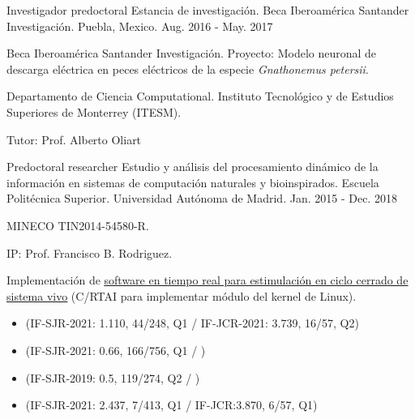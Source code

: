 \begin{cventries}
  \cventry
    {Investigador predoctoral} %
    {Estancia de investigación. Beca Iberoamérica Santander Investigación.} %
    {Puebla, Mexico.} %
    {Aug. 2016 - May. 2017} %
    {
    \begin{cvitems}
     \item {Beca Iberoamérica Santander Investigación. Proyecto: Modelo neuronal de descarga eléctrica en peces eléctricos de la especie \textit{Gnathonemus petersii}.}
     \item {Departamento de Ciencia Computational. Instituto Tecnológico y de Estudios Superiores de Monterrey (ITESM).}
     \item {Tutor: Prof. Alberto Oliart}
    \end{cvitems}
    }


  \cventry
    {Predoctoral researcher} %
    {Estudio y análisis del procesamiento dinámico de la información en sistemas de computación naturales y bioinspirados.} %
    {Escuela Politécnica Superior. Universidad Autónoma de Madrid.} %
    {Jan. 2015 - Dec. 2018} %
    {
      \begin{cvitems} %
        \item {MINECO TIN2014-54580-R.}
        \item {IP: Prof. Francisco B. Rodriguez.}
        \item {Implementación de \underline{\href{http://arantxa.ii.uam.es/~gnb/material.htm}{software en tiempo real para estimulación en ciclo cerrado de sistema vivo}} (C/RTAI para implementar módulo del kernel de Linux).}
      \end{cvitems}
    }

\end{cventries}


\begin{itemize}
\item {} (IF-SJR-2021: 1.110, 44/248, Q1 / IF-JCR-2021: 3.739, 16/57, Q2)

\item {} (IF-SJR-2021: 0.66, 166/756, Q1 / )

\item {} (IF-SJR-2019: 0.5, 119/274, Q2 / )

\item {} (IF-SJR-2021: 2.437, 7/413, Q1 / IF-JCR:3.870, 6/57, Q1)
\end{itemize}


